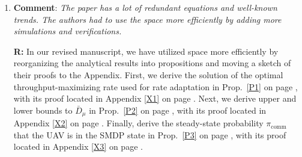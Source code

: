 \documentclass[12pt, draftcls, onecolumn]{IEEEtran}
\theoremstyle{plain}
\theoremstyle{definition}
\theoremstyle{remark}
\begin{document}
\begin{enumerate}
    
    
    \item \textbf{Comment}: \emph{The paper has a lot of redundant equations and well-known trends. The authors had to use the space more efficiently by adding more simulations and verifications.}
    \vspace{2mm}
    
    \textbf{R:} In our revised manuscript, we have utilized space more efficiently by reorganizing the analytical results into propositions and moving a sketch of their proofs to the Appendix. First, we derive the solution of the optimal throughput-maximizing rate used for rate adaptation in Prop.~\ref{P1} on page \pageref{P1}, with its proof located in Appendix \ref{X1} on page \pageref{X1}. Next, we derive upper and lower bounds to $\bar{D}_{\mu}$ in Prop.~\ref{P2} on page \pageref{P2}, with its proof located in Appendix \ref{X2} on page \pageref{X2}. Finally, derive the steady-state probability $\pi_{\mathrm{comm}}$ that the UAV is in the SMDP state in Prop.~\ref{P3} on page \pageref{P3}, with its proof located in Appendix \ref{X3} on page \pageref{X3}.
    \vspace{2mm}
    

\end{enumerate}
\end{document}

